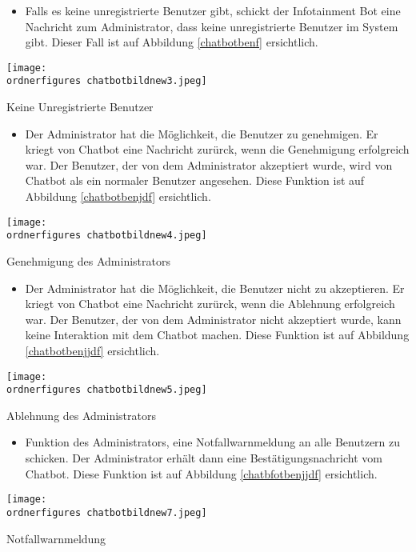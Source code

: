 \begin{itemize}
	\item Falls es keine unregistrierte Benutzer gibt, schickt der Infotainment Bot eine Nachricht zum Administrator, dass keine unregistrierte Benutzer im System gibt. Dieser Fall ist auf Abbildung \ref{chatbotbenf} ersichtlich.
\end{itemize}
\begin{center}
	\captionsetup{type=figure}
	\texttt{[image: \\ordnerfigures chatbotbildnew3.jpeg]}
	\caption{Keine Unregistrierte Benutzer}
	\label{chatbotbenf}
\end{center}
\begin{itemize}
	\item Der Administrator hat die M\"oglichkeit, die Benutzer zu genehmigen. Er kriegt von Chatbot eine Nachricht zur\"urck, wenn die Genehmigung erfolgreich war. Der Benutzer, der von dem Administrator akzeptiert wurde, wird von Chatbot als ein normaler Benutzer angesehen. Diese Funktion ist auf Abbildung \ref{chatbotbenjdf} ersichtlich.
\end{itemize}
\begin{center}
	\captionsetup{type=figure}
	\texttt{[image: \\ordnerfigures chatbotbildnew4.jpeg]}
	\caption{Genehmigung des Administrators}
	\label{chatbotbenjdf}
\end{center}
\begin{itemize}
	\item Der Administrator hat die M\"oglichkeit, die Benutzer nicht zu akzeptieren. Er kriegt von Chatbot eine Nachricht zur\"urck, wenn die Ablehnung erfolgreich war. Der Benutzer, der von dem Administrator nicht akzeptiert wurde, kann keine Interaktion mit dem Chatbot machen. Diese Funktion ist auf Abbildung \ref{chatbotbenjjdf} ersichtlich.
\end{itemize}
\begin{center}
	\captionsetup{type=figure}
	\texttt{[image: \\ordnerfigures chatbotbildnew5.jpeg]}
	\caption{Ablehnung des Administrators}
	\label{chatbotbenjjdf}
\end{center}
\begin{itemize}
	\item Funktion des Administrators, eine Notfallwarnmeldung an alle Benutzern zu schicken. Der Administrator erhält dann eine Bestätigungsnachricht vom Chatbot. Diese Funktion ist auf Abbildung \ref{chatbfotbenjjdf} ersichtlich.
\end{itemize}
\begin{center}
	\captionsetup{type=figure}
	\texttt{[image: \\ordnerfigures chatbotbildnew7.jpeg]}
	\caption{Notfallwarnmeldung}
	\label{chatbfotbenjjdf}
\end{center}

